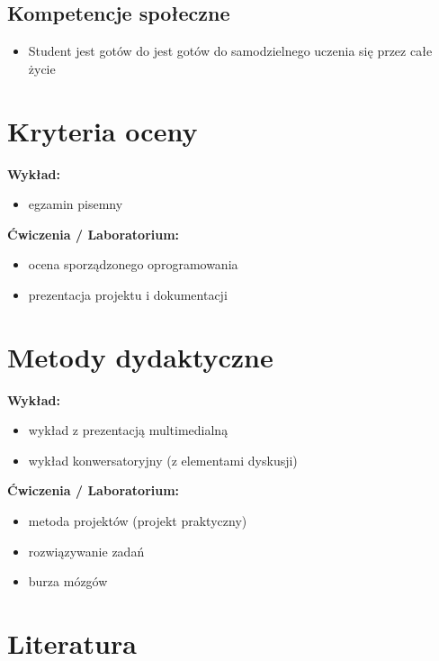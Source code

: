 \documentclass[12pt, a4paper]{article}
\begin{document}
\subsection*{Kompetencje społeczne}
\begin{itemize}
  \item Student jest gotów do jest gotów do samodzielnego uczenia się przez całe życie
\end{itemize}

\section{Kryteria oceny}

\textbf{Wykład:}
\begin{itemize}
  \item egzamin pisemny
\end{itemize}
\vspace{4pt}
\textbf{Ćwiczenia / Laboratorium:}
\begin{itemize}
  \item ocena sporządzonego oprogramowania
  \item prezentacja projektu i dokumentacji
\end{itemize}


\section{Metody dydaktyczne}

\textbf{Wykład:}
\begin{itemize}
  \item wykład z prezentacją multimedialną
  \item wykład konwersatoryjny (z elementami dyskusji)
\end{itemize}
\vspace{4pt}
\textbf{Ćwiczenia / Laboratorium:}
\begin{itemize}
  \item metoda projektów (projekt praktyczny)
  \item rozwiązywanie zadań
  \item burza mózgów
\end{itemize}
\vspace{4pt}


\section{Literatura}
\end{document}

